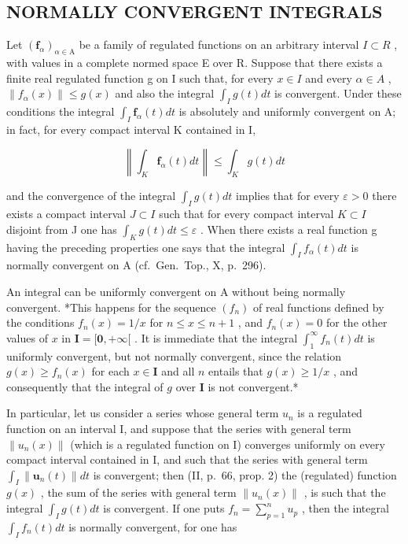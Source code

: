 \subsection{NORMALLY CONVERGENT INTEGRALS}

Let \((\mathbf{f}_{\alpha})_{\alpha\in\mathrm{A}}\) be a family of regulated functions on an arbitrary interval \(I\subset R\) , with values in a complete normed space E over R. Suppose that there exists a finite real regulated function g on I such that, for every \(x\in I\) and every \(\alpha\in A\) , \(\|f_{\alpha}(x)\|\leqslant g(x)\) and also the integral \(\int_{I}g(t)dt\) is convergent. Under these conditions the integral \(\int_{I}\mathbf{f}_{\alpha}(t)dt\) is absolutely and uniformly convergent on A; in fact, for every compact interval K contained in I,

\[
\left\| \int_ {K} \mathbf {f} _ {\alpha} (t) d t \right\| \leqslant \int_ {K} g (t) d t
\]

and the convergence of the integral \(\int_{I} g(t) dt\) implies that for every \(\varepsilon > 0\) there exists a compact interval \(J \subset I\) such that for every compact interval \(K \subset I\) disjoint from J one has \(\int_{K} g(t) dt \leqslant \varepsilon\) . When there exists a real function g having the preceding properties one says that the integral \(\int_{I} f_{\alpha}(t) dt\) is normally convergent on A (cf.~Gen.~Top., X, p.~296).

An integral can be uniformly convergent on A without being normally convergent. *This happens for the sequence \((f_n)\) of real functions defined by the conditions \(f_n(x) = 1 / x\) for \(n \leqslant x \leqslant n + 1\) , and \(f_n(x) = 0\) for the other values of \(x\) in \(\mathbf{I} = [\mathbf{0}, +\infty[\) . It is immediate that the integral \(\int_{1}^{\infty} f_n(t) dt\) is uniformly convergent, but not normally convergent, since the relation \(g(x) \geqslant f_n(x)\) for each \(x \in \mathbf{I}\) and all \(n\) entails that \(g(x) \geqslant 1 / x\) , and consequently that the integral of \(g\) over \(\mathbf{I}\) is not convergent.*

In particular, let us consider a series whose general term \(u_{n}\) is a regulated function on an interval I, and suppose that the series with general term \(\|u_{n}(x)\|\) (which is a regulated function on I) converges uniformly on every compact interval contained in I, and such that the series with general term \(\int_{I}\|\mathbf{u}_{n}(t)\|dt\) is convergent; then (II, p.~66, prop. 2) the (regulated) function \(g(x)\) , the sum of the series with general term \(\|u_{n}(x)\|\) , is such that the integral \(\int_{I}g(t)dt\) is convergent. If one puts \(f_{n}=\sum_{p=1}^{n}u_{p}\) , then the integral \(\int_{I}f_{n}(t)dt\) is normally convergent, for one has

